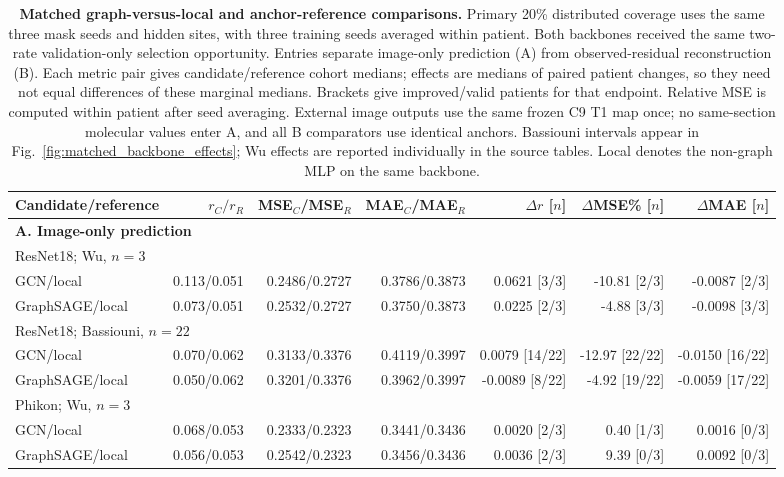 \begin{table}[p]
\centering
\caption{\textbf{Matched graph-versus-local and anchor-reference comparisons.} Primary 20\% distributed coverage uses the same three mask seeds and hidden sites, with three training seeds averaged within patient. Both backbones received the same two-rate validation-only selection opportunity. Entries separate image-only prediction (A) from observed-residual reconstruction (B). Each metric pair gives candidate/reference cohort medians; effects are medians of paired patient changes, so they need not equal differences of these marginal medians. Brackets give improved/valid patients for that endpoint. Relative MSE is computed within patient after seed averaging. External image outputs use the same frozen C9 T1 map once; no same-section molecular values enter A, and all B comparators use identical anchors. Bassiouni intervals appear in Fig.~\ref{fig:matched_backbone_effects}; Wu effects are reported individually in the source tables. Local denotes the non-graph MLP on the same backbone.}
\label{tab:matched_backbone}
\scriptsize\setlength{\tabcolsep}{2pt}\renewcommand{\arraystretch}{1.08}
\begin{tabular}{lrrrrrr}\toprule
Candidate/reference & $r_C/r_R$ & MSE$_C$/MSE$_R$ & MAE$_C$/MAE$_R$ & $\Delta r$ [$n$] & $\Delta$MSE\% [$n$] & $\Delta$MAE [$n$]\\\midrule
\multicolumn{7}{l}{\textbf{A. Image-only prediction}}\\
\multicolumn{7}{l}{ResNet18; Wu, $n=3$}\\
GCN/local & 0.113/0.051 & 0.2486/0.2727 & 0.3786/0.3873 & 0.0621 [3/3] & -10.81 [2/3] & -0.0087 [2/3]\\
GraphSAGE/local & 0.073/0.051 & 0.2532/0.2727 & 0.3750/0.3873 & 0.0225 [2/3] & -4.88 [3/3] & -0.0098 [3/3]\\
\multicolumn{7}{l}{ResNet18; Bassiouni, $n=22$}\\
GCN/local & 0.070/0.062 & 0.3133/0.3376 & 0.4119/0.3997 & 0.0079 [14/22] & -12.97 [22/22] & -0.0150 [16/22]\\
GraphSAGE/local & 0.050/0.062 & 0.3201/0.3376 & 0.3962/0.3997 & -0.0089 [8/22] & -4.92 [19/22] & -0.0059 [17/22]\\
\multicolumn{7}{l}{Phikon; Wu, $n=3$}\\
GCN/local & 0.068/0.053 & 0.2333/0.2323 & 0.3441/0.3436 & 0.0020 [2/3] & 0.40 [1/3] & 0.0016 [0/3]\\
GraphSAGE/local & 0.056/0.053 & 0.2542/0.2323 & 0.3456/0.3436 & 0.0036 [2/3] & 9.39 [0/3] & 0.0092 [0/3]\\

\end{tabular}
\end{table}
